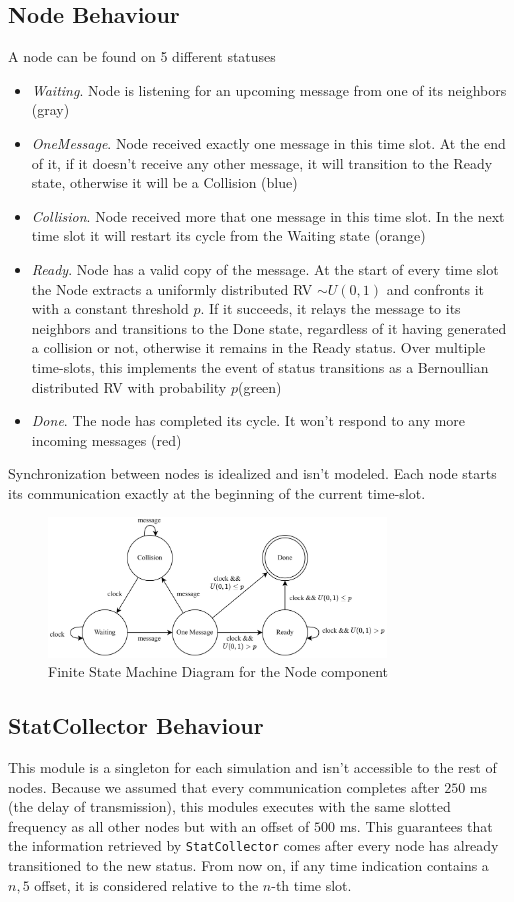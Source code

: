 \subsection{Node Behaviour}
A node can be found on 5 different statuses
\begin{itemize}
\item \textit{Waiting}. Node is listening for an upcoming message from one of its neighbors (gray)
\item \textit{OneMessage}. Node received exactly one message in this time slot. At the end of it, if it doesn't receive any other message, it will transition to the Ready state, otherwise it will be a Collision (blue)
\item \textit{Collision}. Node received more that one message in this time slot. In the next time slot it will restart its cycle from the Waiting state (orange)
\item \textit{Ready}. Node has a valid copy of the message. At the start of every time slot the Node extracts a uniformly distributed RV $\sim U(0,1)$ and confronts it with a constant threshold $p$. If it succeeds, it relays the message to its neighbors and transitions to the Done state, regardless of it having generated a collision or not, otherwise it remains in the Ready status. Over multiple time-slots, this implements the event of status transitions as a Bernoullian distributed RV with probability $p$(green)
\item \textit{Done}. The node has completed its cycle. It won't respond to any more incoming messages (red)
\end{itemize}
Synchronization between nodes is idealized and isn't modeled. Each node starts its communication exactly at the beginning of the current time-slot.

\begin{figure}
\centering
\includegraphics[width=0.8\textwidth]{./images/fsm.png}
\caption{Finite State Machine Diagram for the Node component}
\label{fig:fsm}
\end{figure}
\subsection{StatCollector Behaviour}
This module is a singleton for each simulation and isn't accessible to the rest of nodes. Because we assumed that every communication completes after $250$ ms (the delay of transmission), this modules executes with the same slotted frequency as all other nodes but with an offset of $500$ ms. This guarantees that the information retrieved by \texttt{StatCollector} comes after every node has already transitioned to the new status. From now on, if any time indication contains a $n,5$ offset, it is considered relative to the $n$-th time slot.

